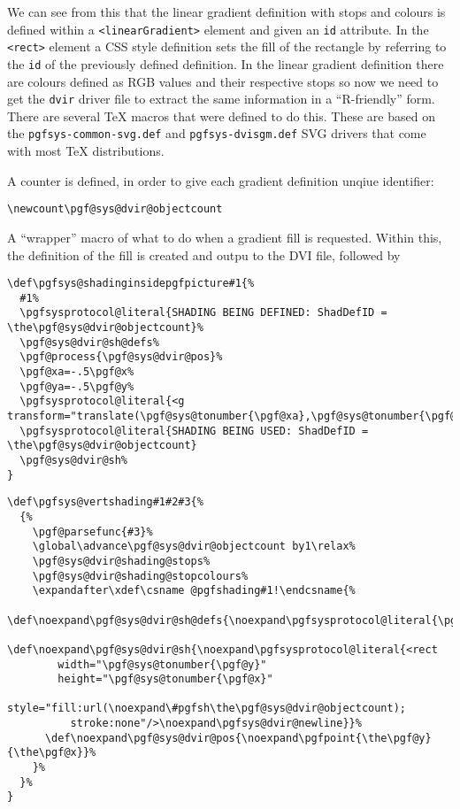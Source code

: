 \documentclass[]{article}
\begin{document}
We can see from this that the linear gradient definition with stops and
colours is defined within a
\texttt{\textless{}linearGradient\textgreater{}} element and given an
\texttt{id} attribute. In the \texttt{\textless{}rect\textgreater{}}
element a CSS style definition sets the fill of the rectangle by
referring to the \texttt{id} of the previously defined definition. In
the linear gradient definition there are colours defined as RGB values
and their respective stops so now we need to get the \texttt{dvir}
driver file to extract the same information in a ``R-friendly'' form.
There are several \TeX{} macros that were defined to do this. These are
based on the \texttt{pgfsys-common-svg.def} and
\texttt{pgfsys-dvisgm.def} SVG drivers that come with most \TeX{}
distributions.

A counter is defined, in order to give each gradient definition unqiue
identifier:

\begin{verbatim}
\newcount\pgf@sys@dvir@objectcount
\end{verbatim}

A ``wrapper'' macro of what to do when a gradient fill is requested.
Within this, the definition of the fill is created and outpu to the DVI
file, followed by

\begin{verbatim}
\def\pgfsys@shadinginsidepgfpicture#1{%
  #1%
  \pgfsysprotocol@literal{SHADING BEING DEFINED: ShadDefID = \the\pgf@sys@dvir@objectcount}%
  \pgf@sys@dvir@sh@defs% 
  \pgf@process{\pgf@sys@dvir@pos}%
  \pgf@xa=-.5\pgf@x%
  \pgf@ya=-.5\pgf@y%
  \pgfsysprotocol@literal{<g transform="translate(\pgf@sys@tonumber{\pgf@xa},\pgf@sys@tonumber{\pgf@ya})">}%
  \pgfsysprotocol@literal{SHADING BEING USED: ShadDefID = \the\pgf@sys@dvir@objectcount}
  \pgf@sys@dvir@sh%
}
\end{verbatim}

\begin{verbatim}
\def\pgfsys@vertshading#1#2#3{%
  {%
    \pgf@parsefunc{#3}%
    \global\advance\pgf@sys@dvir@objectcount by1\relax%
    \pgf@sys@dvir@shading@stops%
    \pgf@sys@dvir@shading@stopcolours%
    \expandafter\xdef\csname @pgfshading#1!\endcsname{%
      \def\noexpand\pgf@sys@dvir@sh@defs{\noexpand\pgfsysprotocol@literal{\pgf@sys@dvir@thestops}}%
      \def\noexpand\pgf@sys@dvir@sh{\noexpand\pgfsysprotocol@literal{<rect
        width="\pgf@sys@tonumber{\pgf@y}"
        height="\pgf@sys@tonumber{\pgf@x}"
        style="fill:url(\noexpand\#pgfsh\the\pgf@sys@dvir@objectcount);
          stroke:none"/>\noexpand\pgfsys@dvir@newline}}%
      \def\noexpand\pgf@sys@dvir@pos{\noexpand\pgfpoint{\the\pgf@y}{\the\pgf@x}}%
    }%
  }%
}
\end{verbatim}
\end{document}
